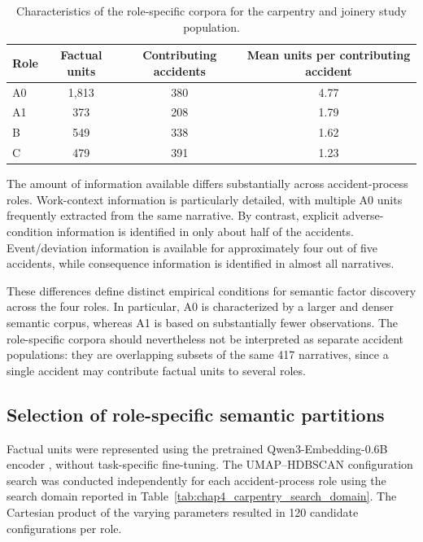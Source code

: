 \begin{table}[!htbp]
\centering
\footnotesize
\caption{Characteristics of the role-specific corpora for the carpentry and
joinery study population.}
\label{tab:chap4_carpentry_corpus_summary}
\renewcommand{\arraystretch}{1.15}
\setlength{\tabcolsep}{8pt}

\begin{tabular}{lccc}
\toprule
\textbf{Role}
& \textbf{Factual units}
& \textbf{Contributing accidents}
& \textbf{Mean units per contributing accident} \\
\midrule
A0 & 1,813 & 380 & 4.77 \\
A1 & 373   & 208 & 1.79 \\
B  & 549   & 338 & 1.62 \\
C  & 479   & 391 & 1.23 \\
\bottomrule
\end{tabular}
\end{table}

The amount of information available differs substantially across
accident-process roles. Work-context information is particularly detailed,
with multiple A0 units frequently extracted from the same narrative.
By contrast, explicit adverse-condition information is identified in only
about half of the accidents. Event/deviation information is available for
approximately four out of five accidents, while consequence information is
identified in almost all narratives.

These differences define distinct empirical conditions for semantic factor
discovery across the four roles. In particular, A0 is characterized by a
larger and denser semantic corpus, whereas A1 is based on substantially fewer
observations. The role-specific corpora should nevertheless not be interpreted
as separate accident populations: they are overlapping subsets of the same
417 narratives, since a single accident may contribute factual units to
several roles.

\subsection{Selection of role-specific semantic partitions}
\label{sec:chap4_carpentry_partition_selection}

Factual units were represented using the pretrained
Qwen3-Embedding-0.6B encoder \citep{zhang2025qwen3embedding}, without
task-specific fine-tuning. The UMAP--HDBSCAN configuration search was
conducted independently for each accident-process role using the search domain
reported in Table~\ref{tab:chap4_carpentry_search_domain}. The Cartesian
product of the varying parameters resulted in 120 candidate configurations per
role.

